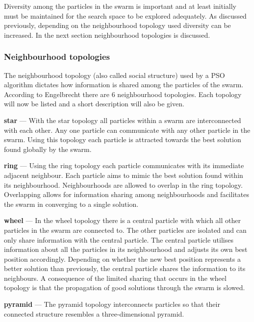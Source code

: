 Diversity among the particles in the swarm is important and at least initially must be maintained for the search space to be explored adequately. As discussed previously, depending on the neighbourhood topology used diversity can be increased. In the next section neighbourhood topologies is discussed.
\subsubsection{Neighbourhood topologies}
The neighbourhood topology (also called social structure) used by a \gls{PSO} algorithm dictates how information is shared among the particles of the swarm. According to Engelbrecht\cite{FundamentalSwarm} there are 6 neighbourhood topologies. Each topology will now be listed and a short description will also be given.
\begin{description}
\item{\textbf{star}} --- With the star topology all particles within a swarm are interconnected with each other. Any one particle can communicate with any other particle in the swarm\cite{FundamentalSwarm}. Using this topology each particle is attracted towards the best solution found globally by the swarm\cite{FundamentalSwarm}. 
\item{\textbf{ring}} --- Using the ring topology each particle communicates with its immediate adjacent neighbour\cite{FundamentalSwarm}. Each particle aims to mimic the best solution found within its neighbourhood\cite{FundamentalSwarm}. Neighbourhoods are allowed to overlap in the ring topology\cite{FundamentalSwarm}. Overlapping allows for information sharing among neighbourhoods and facilitates the swarm in converging to a single solution\cite{FundamentalSwarm}. 
\item{\textbf{wheel}} --- In the wheel topology there is a central particle with which all other particles in the swarm are connected to\cite{FundamentalSwarm}. The other particles are isolated and can only share information with the central particle\cite{FundamentalSwarm}. The central particle utilises information about all the particles in its neighbourhood and adjusts its own best position accordingly\cite{FundamentalSwarm}. Depending on whether the new best position represents a better solution than previously, the central particle shares the information to its neighbours\cite{FundamentalSwarm}. A consequence of the limited sharing that occurs in the wheel topology is that the propagation of good solutions through the swarm is slowed\cite{FundamentalSwarm}.
\item{\textbf{pyramid}} --- The pyramid topology interconnects particles so that their connected structure resembles a three-dimensional pyramid\cite{FundamentalSwarm}.

\end{description}

